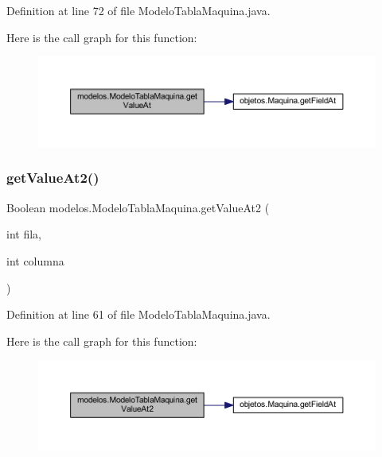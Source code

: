 Definition at line 72 of file Modelo\+Tabla\+Maquina.\+java.

Here is the call graph for this function\+:\nopagebreak
\begin{figure}[H]
\begin{center}
\leavevmode
\includegraphics[width=350pt]{classmodelos_1_1_modelo_tabla_maquina_ae6611198ecf631949ddb041b8231da95_cgraph}
\end{center}
\end{figure}
\mbox{\label{classmodelos_1_1_modelo_tabla_maquina_a76d930fbec2a211e91095ac641f030cb}} 
\subsubsection{\texorpdfstring{get\+Value\+At2()}{getValueAt2()}}
{\footnotesize\ttfamily Boolean modelos.\+Modelo\+Tabla\+Maquina.\+get\+Value\+At2 (\begin{DoxyParamCaption}\item[{int}]{fila,  }\item[{int}]{columna }\end{DoxyParamCaption})}



Definition at line 61 of file Modelo\+Tabla\+Maquina.\+java.

Here is the call graph for this function\+:\nopagebreak
\begin{figure}[H]
\begin{center}
\leavevmode
\includegraphics[width=350pt]{classmodelos_1_1_modelo_tabla_maquina_a76d930fbec2a211e91095ac641f030cb_cgraph}
\end{center}
\end{figure}
\mbox{\label{classmodelos_1_1_modelo_tabla_maquina_ab81f2b02aa2cc4c0f9c93111ba345df8}} 
